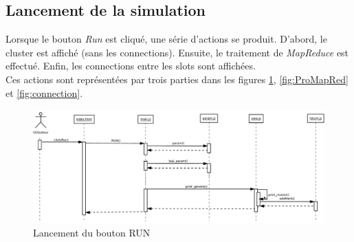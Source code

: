\subsection{Lancement de la simulation}
Lorsque le bouton {\it Run} est cliqué, une série d'actions se produit.
D'abord, le cluster est affiché (sans les connections). Ensuite, le traitement de {\it MapReduce} est effectué. Enfin, les connections entre les slots sont affichées.\\
Ces actions sont représentées par trois parties dans les figures \ref{fig:run}, \ref{fig:ProMapRed} et \ref{fig:connection}.
\begin{figure}[H]
  \centering
    \includegraphics[angle=90,height=0.95\textheight]{diagram/diag_seq_init.pdf}
        \caption{Lancement du bouton RUN}
        \label{fig:run}
\end{figure}

